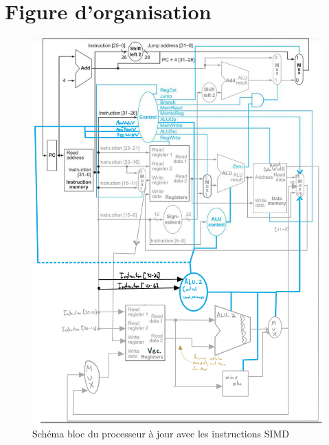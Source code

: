 \documentclass[a11paper]{article}
\begin{document}
\section{Figure d'organisation}

\begin{figure}[H]
  \centering
  \includegraphics[width=.7\textwidth]{assets/bloc.jpeg}
  \caption{Schéma bloc du processeur à jour avec les instructions SIMD}
  \label{fig:bloc-diagram}
\end{figure}
\end{document}
